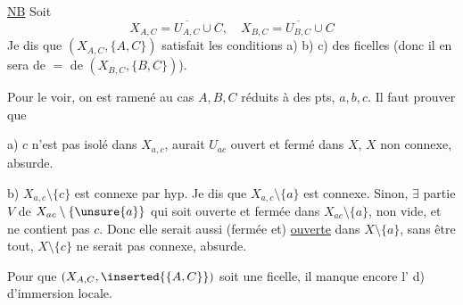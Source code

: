 \uline{NB} Soit
\[
X_{A,C}=\overline{U_{A,C}}\cup C,\quad
X_{B,C}=\overline{U_{B,C}}\cup C
\]
Je dis que $(X_{A,C},\{A,C\})$ satisfait les conditions a) b) c) des ficelles
(donc il en sera de $=$ de $(X_{B,C},\{B,C\})$).

Pour le voir, on est ramené au cas $A,B,C$ réduits à des pts, $a,b,c$.
Il faut prouver que

a)  $c$ n'est pas isolé dans $X_{a,c}$,
  aurait $U_{ac}$ ouvert et fermé dans $X$,
$X$  non connexe, absurde.

b) $X_{a,c}\setminus\{c\}$ est connexe par hyp.
Je dis que $X_{a,c}\setminus\{a\}$ est connexe.
Sinon,  $\exists$ partie $V$ de $X_{ac}\setminus\{\unsure{a}\}$ qui soit ouverte et fermée dans $X_{ac}\setminus\{a\}$,
non vide, et ne contient pas $c$.
Donc elle serait aussi  (fermée et) \uline{ouverte}
dans $X\setminus\{a\}$, sans  être tout,
$X\setminus\{c\}$ ne serait pas connexe, absurde.

Pour que $(X_{A,C},\inserted{\{A,C\}})$ soit une ficelle,
il manque encore l' d) d'immersion locale.

